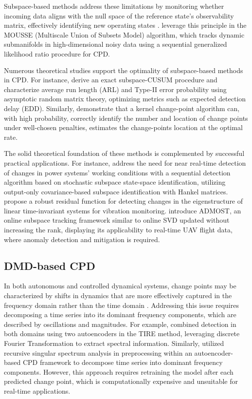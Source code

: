 Subspace-based methods address these limitations by monitoring whether incoming data aligns with the null space of the reference state's observability matrix, effectively identifying new operating states \citep{Dohler2013, Ye2023}. \citet{Xie2013} leverage this principle in the MOUSSE (Multiscale Union of Subsets Model) algorithm, which tracks dynamic submanifolds in high-dimensional noisy data using a sequential generalized likelihood ratio procedure for CPD.

Numerous theoretical studies support the optimality of subspace-based methods in CPD. For instance, \citet{Ye2023} derive an exact subspace-CUSUM procedure and characterize average run length (ARL) and Type-II error probability using asymptotic random matrix theory, optimizing metrics such as expected detection delay (EDD). Similarly, \citet{Garreau2018} demonstrate that a kernel change-point algorithm can, with high probability, correctly identify the number and location of change points under well-chosen penalties, estimates the change-points location at the optimal rate.

The solid theoretical foundation of these methods is complemented by successful practical applications. For instance, \citet{Hosur2019} address the need for near real-time detection of changes in power systems' working conditions with a sequential detection algorithm based on stochastic subspace state-space identification, utilizing output-only covariance-based subspace identification with Hankel matrices. \citet{Dohler2013} propose a robust residual function for detecting changes in the eigenstructure of linear time-invariant systems for vibration monitoring. \citet{He2019} introduce ADMOST, an online subspace tracking framework similar to online SVD updated without increasing the rank, displaying its applicability to real-time UAV flight data, where anomaly detection and mitigation is required.

\subsection{DMD-based CPD}
In both autonomous and controlled dynamical systems, change points may be characterized by shifts in dynamics that are more effectively captured in the frequency domain rather than the time domain \citep{DeRyck2021, Gupta2022}. Addressing this issue requires decomposing a time series into its dominant frequency components, which are described by oscillations and magnitudes. For example, \citet{DeRyck2021} combined detection in both domains using two autoencoders in the TIRE method, leveraging discrete Fourier Transformation to extract spectral information. Similarly, \citet{Gupta2022} utilized recursive singular spectrum analysis in preprocessing within an autoencoder-based CPD framework to decompose time series into dominant frequency components. However, this approach requires retraining the model after each predicted change point, which is computationally expensive and unsuitable for real-time applications.

